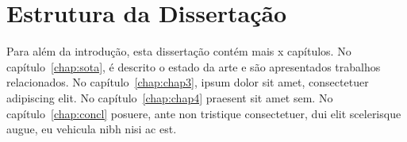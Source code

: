 \section{Estrutura da Dissertação} \label{sec:struct}

Para além da introdução, esta dissertação contém mais x capítulos.
No capítulo~\ref{chap:sota}, é descrito o estado da arte e são
apresentados trabalhos relacionados.
No capítulo~\ref{chap:chap3}, ipsum dolor sit amet, consectetuer
adipiscing elit.
No capítulo~\ref{chap:chap4} praesent sit amet sem.
No capítulo~\ref{chap:concl}  posuere, ante non tristique
consectetuer, dui elit scelerisque augue, eu vehicula nibh nisi ac
est.
